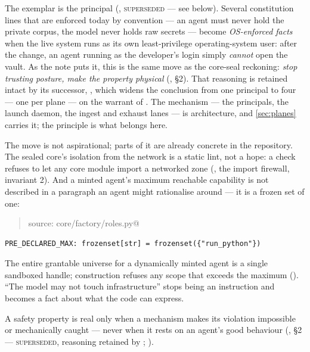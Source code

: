 The exemplar is the \Ouroboros{} principal (,
\textsc{superseded} --- see below). Several constitution lines that are enforced
today by convention --- an agent must never hold the private corpus, the model never
holds raw secrets --- become \emph{OS-enforced facts} when the live system runs as
its own least-privilege operating-system user: after the change, an agent running as
the developer's login simply \emph{cannot} open the vault. As the note puts it, this
is the same move as the core-seal reckoning: \emph{stop trusting posture, make the
property physical} (, \S 2). That reasoning is
retained intact by its successor, , which widens the
conclusion from one principal to four --- one per plane --- on the warrant of
. The mechanism --- the principals, the launch daemon, the
ingest and exhaust lanes --- is architecture, and \autoref{sec:planes} carries it;
the principle is what belongs here.

The move is not aspirational; parts of it are already concrete in the repository.
The sealed core's isolation from the network is a static lint, not a hope: a
check refuses to let any core module import a networked zone
(, the import firewall, invariant 2). And
a minted agent's maximum reachable capability is not described in a paragraph an
agent might rationalise around --- it is a frozen set of one:

\begin{quote}\small\ttfamily
source: core/factory/roles.py@\gitref
\end{quote}
\begin{verbatim}
PRE_DECLARED_MAX: frozenset[str] = frozenset({"run_python"})
\end{verbatim}
\noindent The entire grantable universe for a dynamically minted agent is a single
sandboxed handle; construction refuses any scope that exceeds the maximum
(). ``The model may not touch
infrastructure'' stops being an instruction and becomes a fact about what the code
can express.

\begin{principle}
A safety property is real only when a mechanism makes its violation impossible or
mechanically caught --- never when it rests on an agent's good behaviour
(, \S 2 --- \textsc{superseded}, reasoning
retained by ; ).
\end{principle}

